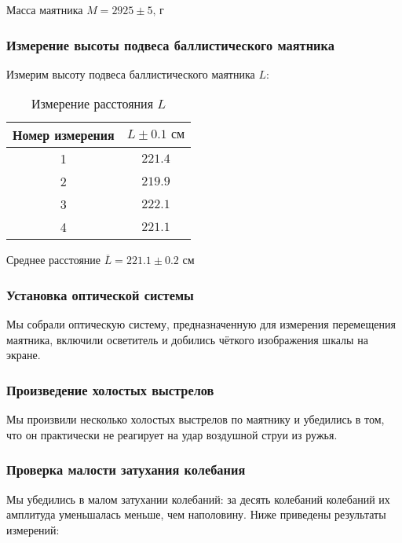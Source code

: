 \documentclass[a4paper]{article}
\begin{document}
\item Масса маятника $M = 2925\pm{5}\text{, г}$

\subsubsection{Измерение высоты подвеса баллистического маятника}

Измерим высоту подвеса баллистического маятника $L$:

\begin{table}[h!]
\centering
\caption{Измерение расстояния $L$}
\begin{tabular}{|c|c|}
\hline
Номер измерения & $L \pm{0.1}\text{ см}$  \\ \hline
1  & $221.4$ \\ \hline
2  & $219.9$ \\ \hline
3  & $222.1$ \\ \hline
4  & $221.1$ \\ \hline
\end{tabular}
\end{table}

\item Среднее расстояние $\overline{L} = 221.1 \pm{0.2} \text{ см}$

\subsubsection{Установка оптической системы}

Мы собрали оптическую систему, предназначенную для измерения перемещения маятника, включили осветитель и добились чёткого изображения шкалы на экране.

\subsubsection{Произведение холостых выстрелов}

Мы произвили несколько холостых выстрелов по маятнику и убедились в том, что он практически не реагирует на удар воздушной струи из ружья.

\subsubsection{Проверка малости затухания колебания}

Мы убедились в малом затухании колебаний: за десять колебаний колебаний их амплитуда уменьшалась меньше, чем наполовину. Ниже приведены результаты измерений:
\end{document}
